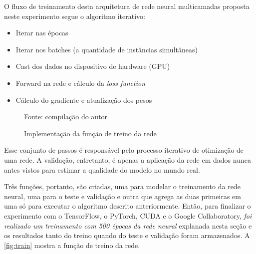 O fluxo de treinamento desta arquitetura de rede neural multicamadas proposta neste experimento segue o algoritmo iterativo:

\begin{itemize}
	\item Iterar nas épocas
	\item Iterar nos batches (a quantidade de instâncias simultâneas)
	\item Cast dos dados no dispositivo de hardware (GPU)
	\item Forward na rede e cálculo da \textit{loss function}
	\item Cálculo do gradiente e atualização dos pesos
\end{itemize}

\begin{figure}[H]
	\centering
	\caption{Implementação da função de treino da rede}
	
	\label{fig:train}
	{\scriptsize Fonte: compilação do autor}
\end{figure}

Esse conjunto de passos é responsável pelo processo iterativo de otimização de uma rede. A validação, entretanto, é apenas a aplicação da rede em dados nunca antes vistos para estimar a qualidade do modelo no mundo real.

Três funções, portanto, são criadas, uma para modelar o treinamento da rede neural, uma para o teste e validação e outra que agrega as duas primeiras em uma só para executar o algoritmo descrito anteriormente. Então, para finalizar o experimento com o TensorFlow, o PyTorch, CUDA e o Google Collaboratory, \textit{foi realizado um treinamento com 500 épocas da rede neural} explanada nesta seção e os resultados tanto do treino quando do teste e validação foram armazenados. A \autoref{fig:train} mostra a função de treino da rede.  

